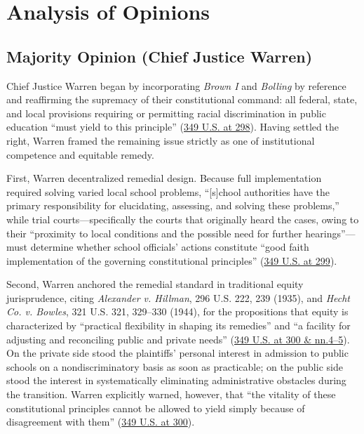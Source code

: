 \documentclass[12pt]{article}
\begin{document}
\section{Analysis of Opinions}

\subsection{Majority Opinion (Chief Justice Warren)}

Chief Justice Warren began by incorporating \textit{Brown I} and \textit{Bolling} by reference and reaffirming the supremacy of their constitutional command: all federal, state, and local provisions requiring or permitting racial discrimination in public education ``must yield to this principle'' (\href{https://supreme.justia.com/cases/federal/us/349/294/}{349 U.S. at 298}). Having settled the right, Warren framed the remaining issue strictly as one of institutional competence and equitable remedy.

First, Warren decentralized remedial design. Because full implementation required solving varied local school problems, ``[s]chool authorities have the primary responsibility for elucidating, assessing, and solving these problems,'' while trial courts---specifically the courts that originally heard the cases, owing to their ``proximity to local conditions and the possible need for further hearings''---must determine whether school officials' actions constitute ``good faith implementation of the governing constitutional principles'' (\href{https://supreme.justia.com/cases/federal/us/349/294/}{349 U.S. at 299}).

Second, Warren anchored the remedial standard in traditional equity jurisprudence, citing \textit{Alexander v. Hillman}, 296 U.S. 222, 239 (1935), and \textit{Hecht Co. v. Bowles}, 321 U.S. 321, 329--330 (1944), for the propositions that equity is characterized by ``practical flexibility in shaping its remedies'' and ``a facility for adjusting and reconciling public and private needs'' (\href{https://supreme.justia.com/cases/federal/us/349/294/}{349 U.S. at 300 \& nn.4--5}). On the private side stood the plaintiffs' personal interest in admission to public schools on a nondiscriminatory basis as soon as practicable; on the public side stood the interest in systematically eliminating administrative obstacles during the transition. Warren explicitly warned, however, that ``the vitality of these constitutional principles cannot be allowed to yield simply because of disagreement with them'' (\href{https://supreme.justia.com/cases/federal/us/349/294/}{349 U.S. at 300}).
\end{document}
